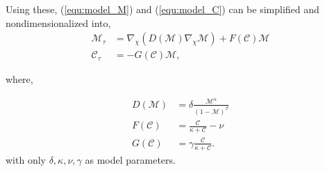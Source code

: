 % 
% 
% 
% 
% 
% 

Using these, (\ref{equ:model_M}) and (\ref{equ:model_C}) can be simplified and nondimensionalized into, 
\begin{align} \label{equ:model_system}
  \mathcal{M}_\tau &= \nabla_\chi \left( D(\mathcal{M}) \nabla_\chi \mathcal{M} \right) + F(\mathcal{C}) \mathcal{M} \\
  \mathcal{C}_\tau &= - G(\mathcal{C}) \mathcal{M}, 
\end{align}

where,

\begin{equation}
\begin{aligned} \label{equ:model_functions}
  D(\mathcal{M}) &= \delta \frac{\mathcal{M}^\alpha}{(1 - \mathcal{M})^\beta} \\
  F(\mathcal{C}) &= \frac{ \mathcal{C}} {\kappa + \mathcal{C}} - \nu \\
  G(\mathcal{C}) &= \gamma \frac{\mathcal{C}}{\kappa +\mathcal{C}}.
\end{aligned}
\end{equation}
with only $\delta, \kappa, \nu, \gamma$ as model parameters. 

